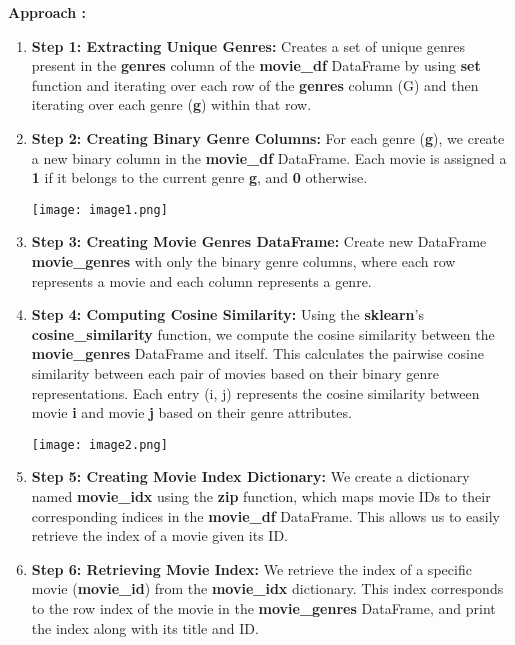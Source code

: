 \documentclass[a4paper]{article}
\theoremstyle{plain}
\theoremstyle{definition}
\begin{document}
        \textbf{Approach :}
        \begin{enumerate}
            \item \textbf{Step 1: Extracting Unique Genres:}
            Creates a set of unique genres present in the \textbf{genres} column of the \textbf{movie\_df} DataFrame by using \textbf{set} function and iterating over each row of the \textbf{genres} column (G) and then iterating over each genre (\textbf{g}) within that row.
            
            \item \textbf{Step 2: Creating Binary Genre Columns:}
            For each genre (\textbf{g}), we create a new binary column in the \textbf{movie\_df} DataFrame. Each movie is assigned a \textbf{1} if it belongs to the current genre \textbf{g}, and \textbf{0} otherwise.

            
            \texttt{[image: image1.png]} %
            
            \item \textbf{Step 3: Creating Movie Genres DataFrame:}
            Create new DataFrame \textbf{movie\_genres} with only the binary genre columns, where each row represents a movie and each column represents a genre.
            
            \item \textbf{Step 4: Computing Cosine Similarity:}
            Using the \textbf{sklearn}’s \textbf{cosine\_similarity} function, we compute the cosine similarity between the \textbf{movie\_genres} DataFrame and itself. This calculates the pairwise cosine similarity between each pair of movies based on their binary genre representations. Each entry (i, j) represents the cosine similarity between movie \textbf{i} and movie \textbf{j} based on their genre attributes.

            \texttt{[image: image2.png]} %
            
            \item \textbf{Step 5: Creating Movie Index Dictionary:}
            We create a dictionary named \textbf{movie\_idx} using the \textbf{zip} function, which maps movie IDs to their corresponding indices in the \textbf{movie\_df} DataFrame. This allows us to easily retrieve the index of a movie given its ID.
            
            \item \textbf{Step 6: Retrieving Movie Index:}
            We retrieve the index of a specific movie (\textbf{movie\_id}) from the \textbf{movie\_idx} dictionary. This index corresponds to the row index of the movie in the \textbf{movie\_genres} DataFrame, and print the index along with its title and ID.\\
        \end{enumerate}
        
\end{document}
